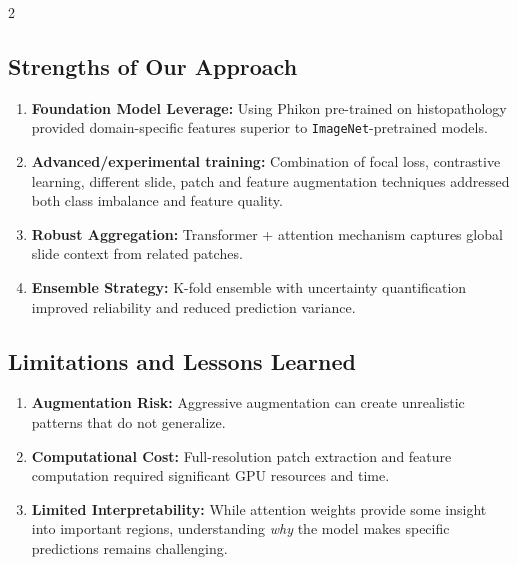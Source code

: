 \documentclass[11pt]{article}
\begin{document}
\begin{multicols}{2}
        \subsection{Strengths of Our Approach}
        \begin{enumerate}[noitemsep,topsep=0pt]
            \setlength{\itemsep}{1pt}
            \setlength{\parskip}{0pt}
            \setlength{\parsep}{0pt}

            \item \textbf{Foundation Model Leverage:} Using Phikon pre-trained on histopathology provided domain-specific features superior to \texttt{ImageNet}-pretrained models.
            \item \textbf{Advanced/experimental training:} Combination of focal loss, contrastive learning, different slide, patch and feature augmentation techniques addressed both class imbalance and feature quality.
            \item \textbf{Robust Aggregation:} Transformer + attention mechanism captures global slide context from related patches.
            \item \textbf{Ensemble Strategy:} K-fold ensemble with uncertainty quantification improved reliability and reduced prediction variance.

        \end{enumerate}

        \vspace{-3mm}
        \subsection{Limitations and Lessons Learned}
        \begin{enumerate}[noitemsep,topsep=0pt]
            \setlength{\itemsep}{1pt}
            \setlength{\parskip}{0pt}
            \setlength{\parsep}{0pt}
            \item \textbf{Augmentation Risk:} Aggressive augmentation can create unrealistic patterns that do not generalize.
            \item \textbf{Computational Cost:} Full-resolution patch extraction and feature computation required significant GPU resources and time.
            \item \textbf{Limited Interpretability:} While attention weights provide some insight into important regions, understanding \textit{why} the model makes specific predictions remains challenging.
        \end{enumerate}


\end{multicols}
\end{document}
